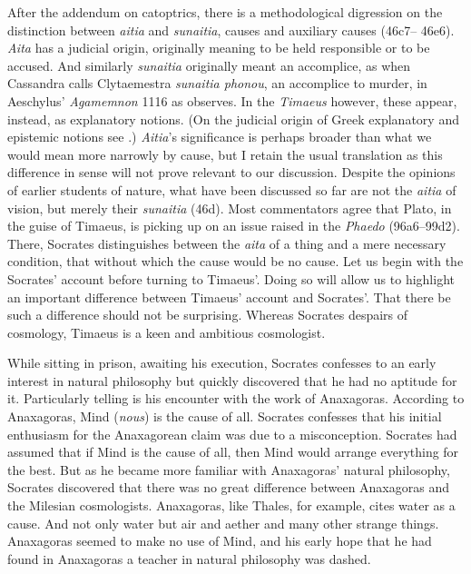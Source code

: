 After the addendum on catoptrics, there is a methodological digression on the distinction between \emph{aitia} and \emph{sunaitia}, causes and auxiliary causes (46c7–
46e6). \emph{Aita} has a judicial origin, originally meaning to be held responsible or to be accused. And similarly \emph{sunaitia} originally meant an accomplice, as when Cassandra calls Clytaemestra \emph{sunaitia phonou}, an accomplice to murder, in Aeschylus' \emph{Agamemnon} 1116 as \citet[291]{Taylor:1928qb} observes. In the \emph{Timaeus} however, these appear, instead, as explanatory notions. (On the judicial origin of Greek explanatory and epistemic notions see \citealt[chapter 4]{Lloyd:1979lc}.) \emph{Aitia}'s significance is perhaps broader than what we would mean more narrowly by cause, but I retain the usual translation as this difference in sense will not prove relevant to our discussion. Despite the opinions of earlier students of nature, what have been discussed so far are not the \emph{aitia} of vision, but merely their \emph{sunaitia} (46d). Most commentators agree that Plato, in the guise of Timaeus, is picking up on an issue raised in the \emph{Phaedo} (96a6--99d2). There, Socrates distinguishes between the \emph{aita} of a thing and a mere necessary condition, that without which the cause would be no cause. Let us begin with the Socrates' account before turning to Timaeus'. Doing so will allow us to highlight an important difference between Timaeus' account and Socrates'. That there be such a difference should not be surprising. Whereas Socrates despairs of cosmology, Timaeus is a keen and ambitious cosmologist.

While sitting in prison, awaiting his execution, Socrates confesses to an early interest in natural philosophy but quickly discovered that he had no aptitude for it. Particularly telling is his encounter with the work of Anaxagoras. According to Anaxagoras, Mind (\emph{nous}) is the cause of all. Socrates confesses that his initial enthusiasm for the Anaxagorean claim was due to a misconception. Socrates had assumed that if Mind is the cause of all, then Mind would arrange everything for the best. But as he became more familiar with Anaxagoras' natural philosophy, Socrates discovered that there was no great difference between Anaxagoras and the Milesian cosmologists. Anaxagoras, like Thales, for example, cites water as a cause. And not only water but air and aether and many other strange things. Anaxagoras seemed to make no use of Mind, and his early hope that he had found in Anaxagoras a teacher in natural philosophy was dashed. 

